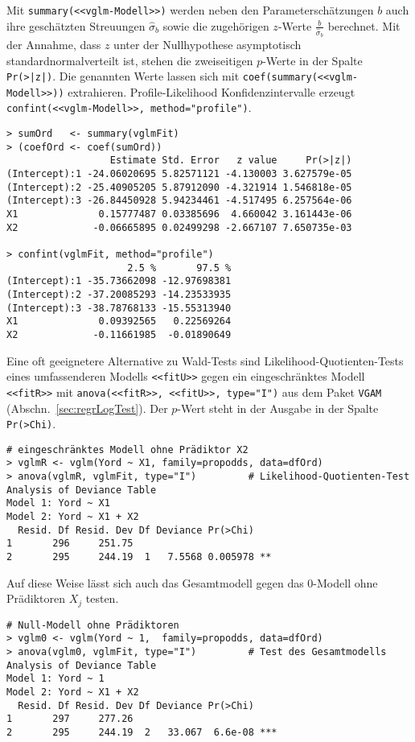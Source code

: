 Mit \lstinline!summary(<<vglm-Modell>>)! werden neben den Parameterschätzungen $b$ auch ihre geschätzten Streuungen $\hat{\sigma}_{b}$ sowie die zugehörigen $z$-Werte $\frac{b}{\hat{\sigma}_{b}}$ berechnet. Mit der Annahme, dass $z$ unter der Nullhypothese asymptotisch standardnormalverteilt ist, stehen die zweiseitigen $p$-Werte in der Spalte \lstinline!Pr(>|z|)!. Die genannten Werte lassen sich mit \lstinline!coef(summary(<<vglm-Modell>>))! extrahieren. Profile-Likelihood Konfidenzintervalle erzeugt \lstinline!confint(<<vglm-Modell>>, method="profile")!.
\begin{lstlisting}
> sumOrd   <- summary(vglmFit)
> (coefOrd <- coef(sumOrd))
                  Estimate Std. Error   z value     Pr(>|z|)
(Intercept):1 -24.06020695 5.82571121 -4.130003 3.627579e-05
(Intercept):2 -25.40905205 5.87912090 -4.321914 1.546818e-05
(Intercept):3 -26.84450928 5.94234461 -4.517495 6.257564e-06
X1              0.15777487 0.03385696  4.660042 3.161443e-06
X2             -0.06665895 0.02499298 -2.667107 7.650735e-03

> confint(vglmFit, method="profile")
                     2.5 %       97.5 %
(Intercept):1 -35.73662098 -12.97698381
(Intercept):2 -37.20085293 -14.23533935
(Intercept):3 -38.78768133 -15.55313940
X1              0.09392565   0.22569264
X2             -0.11661985  -0.01890649
\end{lstlisting}

Eine oft geeignetere Alternative zu Wald-Tests sind Likelihood-Quotienten-Tests eines umfassenderen Modells \lstinline!<<fitU>>! gegen ein eingeschränktes Modell \lstinline!<<fitR>>! mit \lstinline!anova(<<fitR>>, <<fitU>>, type="I")! aus dem Paket \lstinline!VGAM! (Abschn.\ \ref{sec:regrLogTest}). Der $p$-Wert steht in der Ausgabe in der Spalte \lstinline!Pr(>Chi)!.
\begin{lstlisting}
# eingeschränktes Modell ohne Prädiktor X2
> vglmR <- vglm(Yord ~ X1, family=propodds, data=dfOrd)
> anova(vglmR, vglmFit, type="I")         # Likelihood-Quotienten-Test
Analysis of Deviance Table
Model 1: Yord ~ X1
Model 2: Yord ~ X1 + X2
  Resid. Df Resid. Dev Df Deviance Pr(>Chi)   
1       296     251.75                        
2       295     244.19  1   7.5568 0.005978 **
\end{lstlisting}

Auf diese Weise lässt sich auch das Gesamtmodell gegen das $0$-Modell ohne Prädiktoren $X_{j}$ testen.
\begin{lstlisting}
# Null-Modell ohne Prädiktoren
> vglm0 <- vglm(Yord ~ 1,  family=propodds, data=dfOrd)
> anova(vglm0, vglmFit, type="I")         # Test des Gesamtmodells
Analysis of Deviance Table
Model 1: Yord ~ 1
Model 2: Yord ~ X1 + X2
  Resid. Df Resid. Dev Df Deviance Pr(>Chi)    
1       297     277.26                         
2       295     244.19  2   33.067  6.6e-08 ***
\end{lstlisting}

